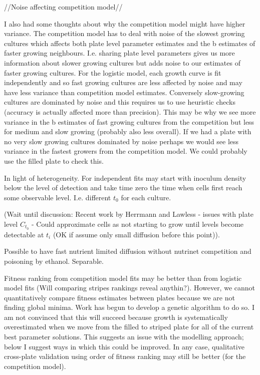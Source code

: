 
//Noise affecting competition model//

I also had some thoughts about why the competition model might have
higher variance. The competition model has to deal with noise of the
slowest growing cultures which affects both plate level parameter
estimates and the b estimates of faster growing
neighbours. I.e. sharing plate level parameters gives us more
information about slower growing cultures but adds noise to our
estimates of faster growing cultures. For the logistic model, each
growth curve is fit independently and so fast growing cultures are
less affected by noise and may have less variance than competition
model estimates. Conversely slow-growing cultures are dominated by
noise and this requires us to use heuristic checks (accuracy is
actually affected more than precision). This may be why we see more
variance in the b estimates of fast growing cultures from the
competition but less for medium and slow growing (probably also less
overall). If we had a plate with no very slow growing cultures
dominated by noise perhaps we would see less variance in the fastest
growers from the competition model. We could probably use the filled
plate to check this.


In light of heterogeneity. For independent fits may start with
inoculum density below the level of detection and take time zero the
time when cells first reach some observable level. I.e. different
\(t_{0}\) for each culture.


(Wait until discussion: Recent work by Herrmann and Lawless - issues
with plate level \(C_{t_{0}}\) - Could approximate cells as not
starting to grow until levels become detectable at \(t_{i}\) (OK if
assume only small diffusion before this point)).



Possible to have fast nutrient limited diffusion without nutrinet
competition and poisoning by ethanol. Separable.


Fitness ranking from competition model fits may be better than from
logistic model fits (Will comparing stripes rankings reveal
anythin?). However, we cannot quantitatively compare fitness estimates
between plates because we are not finding global minima. Work has
begun to develop a genetic algorithm to do so. I am not convinced that
this will succeed because growth is systematically overestimated when
we move from the filled to striped plate for all of the current best
parameter solutions. This suggests an issue with the modelling
approach; below I suggest ways in which this could be improved. In
any case, qualitative cross-plate validation using order of fitness
ranking may still be better (for the competition model).


